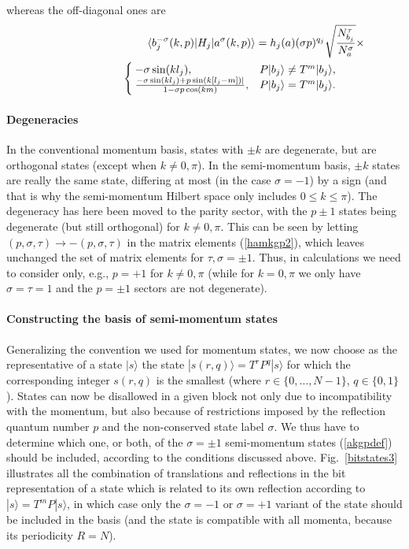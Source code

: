 \documentclass[draft,numberedheadings]{aipproc}
\begin{document}
whereas the off-diagonal ones are
\begin{eqnarray}
&&\langle b_j^{-\sigma}(k,p)|H_j|a^\sigma(k,p)\rangle = h_j(a) (\sigma p)^{q_j}\sqrt{\frac{N^\tau_{b_j}}{N^\sigma_a}} \times \nonumber \\
&& \hskip22mm\left\lbrace \begin{array}{ll}
\hskip-1.0mm -\sigma\sin(kl_j), & P|b_j\rangle \not= T^m|b_j\rangle, \\
\hskip-1.0mm \frac{-\sigma\sin(kl_j)+p\sin(k[l_j-m])|}{1-\sigma p\cos(km)}, & P|b_j\rangle = T^m|b_j\rangle.~~~~~~ 
\end{array}\right.  \label{hamkgp2}
\end{eqnarray}

\paragraph{Degeneracies}

In the conventional momentum basis, states with $\pm k$ are degenerate, but are orthogonal states (except when $k \not =0,\pi$). In 
the semi-momentum basis, $\pm k$ states are really the same state, differing at most (in the case $\sigma =-1$) by a sign (and that is why the semi-momentum 
Hilbert space only includes $0 \le k \le \pi$). The degeneracy has here been moved to the parity sector, with the $p \pm 1$ states being degenerate (but still orthogonal) 
for $k \not =0,\pi$. This can be seen by letting $(p,\sigma,\tau) \to -(p,\sigma,\tau)$ in the matrix elements (\ref{hamkgp2}), which leaves unchanged the set of matrix 
elements for $\tau,\sigma = \pm 1$. Thus, in calculations we need to consider only, e.g., $p=+1$ for $k \not =0,\pi$ (while for $k=0,\pi$ we only have $\sigma=\tau=1$
and the $p = \pm 1$ sectors are not degenerate).

\paragraph{Constructing the basis of semi-momentum states}

Generalizing the convention we used for momentum states, we now choose as the representative of a state $|s\rangle$ the state $|s(r,q)\rangle = T^rP^q|s\rangle$ 
for which the corresponding integer $s(r,q)$ is the smallest (where $r\in \{0,\ldots,N-1\}$, $q\in \{0,1\}$). States can now be disallowed in a given block not 
only due to incompatibility with the momentum, but also because of restrictions imposed by the reflection quantum number $p$ and the non-conserved state label 
$\sigma$. We thus have to determine which one, or both, of the $\sigma=\pm 1$ semi-momentum states (\ref{akgpdef}) should be included, according to the conditions 
discussed above. Fig.~\ref{bitstates3} illustrates all the combination of translations and reflections in the bit representation of a state 
which is related to its own reflection according to $|s\rangle = T^mP|s\rangle$, in which case only the $\sigma=-1$ or $\sigma=+1$ variant of the state should 
be included in the basis (and the state is compatible with all momenta, because its periodicity $R=N$).
\end{document}
